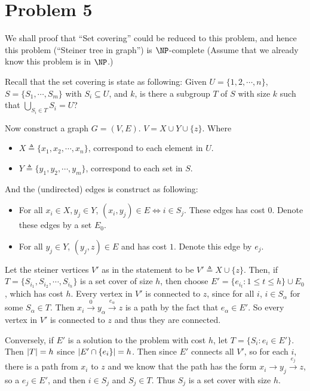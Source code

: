 \documentclass[12pt, a4paper]{article}
\DeclarePairedDelimiter{\abs}{\lvert}{\rvert}
\begin{document}
\section{Problem 5}
We shall proof that ``Set covering'' could be reduced to this problem, and hence
this problem (``Steiner tree in graph'') is $\NP$-complete (Assume that we already know this
problem is in $\NP$.)

Recall that the set covering is state as following: Given $U = \{1, 2, \cdots, n\}$,
$S = \{S_1, \cdots, S_m\}$ with $S_i \subseteq U$, and $k$,
is there a subgroup $T$ of $S$ with size $k$ such that $\bigcup_{S_i \in T} S_i = U$?

Now construct a graph $G = (V, E)$. $V = X \cup Y \cup \{z\}$.
Where
\begin{itemize}
  \item $X \triangleq \{ x_1, x_2, \cdots, x_n\}$, correspond to each element in $U$.
  \item $Y \triangleq \{ y_1, y_2, \cdots, y_m\}$, correspond to each set in $S$.
\end{itemize}
And the (undirected) edges is construct as following:
\begin{itemize}
  \item For all $x_i \in X, y_j \in Y$, $(x_i, y_j) \in E \iff i \in S_j$. These edges has cost $0$.
    Denote these edges by a set $E_0$.
  \item For all $y_j \in Y$, $(y_j, z) \in E$ and has cost $1$. Denote this edge by $e_j$.
\end{itemize}
Let the steiner vertices $V'$ as in the statement to be $V' \triangleq X \cup \{z\}$.
Then, if $T = \{ S_{i_1}, S_{i_2}, \cdots, S_{i_h} \}$ is a set cover of size $h$, then
choose $E' = \{ e_{i_t} : 1 \leq t \leq h \} \cup E_0$, which has cost $h$. Every vertex in $V'$ is
connected to $z$, since for all $i$, $i \in S_\alpha$ for some $S_\alpha \in T$.
Then $x_i \xrightarrow{0} y_\alpha \xrightarrow{e_\alpha} z$ is a path by the fact that $e_\alpha \in E'$.
So every vertex in $V'$ is connected to $z$ and thus they are connected.

Conversely, if $E'$ is a solution to the problem with cost $h$, let $T = \{ S_i : e_i \in E' \}$.
Then $\abs{T} = h$ since $\abs{E' \cap \{ e_i \}} = h$. Then since $E'$ connects all $V'$, so
for each $i$, there is a path from $x_i$ to $z$ and we know that the path has the form
$x_i \to y_j \xrightarrow{e_j} z$, so a $e_j \in E'$, and then $i \in S_j$ and $S_j \in T$.
Thus $S_j$ is a set cover with size $h$.
\end{document}
